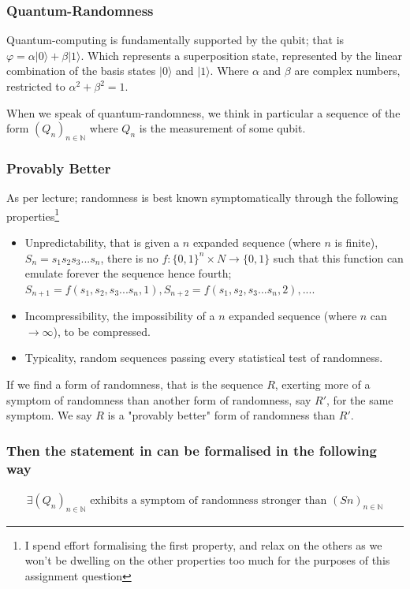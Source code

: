 \documentclass{article}
\begin{document}
\subsubsection*{Quantum-Randomness}
Quantum-computing is fundamentally supported by the qubit; that is $\varphi = \alpha | 0\rangle + \beta | 1\rangle$. Which represents a superposition state, represented by the linear combination of the basis states $| 0\rangle$ and $| 1\rangle$. Where $\alpha$ and $\beta$ are complex numbers, restricted to $\alpha^2 + \beta^2 = 1$. 

When we speak of quantum-randomness, we think in particular a sequence of the form $(Q_n)_{n \in \mathbb{N}}$ where $Q_n$ is the measurement of some qubit.

\pagebreak
\subsubsection*{Provably Better}
As per lecture; randomness is best known symptomatically through the following properties\footnote{I spend effort formalising the first property, and relax on the others as we won't be dwelling on the other properties too much for the purposes of this assignment question}

\begin{itemize}
	\item Unpredictability, that is given a $n$ expanded sequence (where $n$ is finite), $S_n=s_1s_2s_3...s_n$, there is no $f: \{0,1\}^n \times N \rightarrow \{0,1\}$ such that this function can emulate forever the sequence hence fourth; $S_{n+1} = f(s_1,s_2,s_3...s_n, 1), S_{n+2} = f(s_1,s_2,s_3...s_n, 2), ...$.
	\item Incompressibility, the impossibility of a $n$ expanded sequence (where $n$ can $\rightarrow \infty$), to be compressed.
	\item Typicality, random sequences passing every statistical test of randomness.
\end{itemize}

If we find a form of randomness, that is the sequence $R$, exerting more of a symptom of randomness than another form of randomness, say $R'$, for the same symptom. We say $R$ is a "provably better" form of randomness than $R'$.

\subsubsection*{Then the statement in can be formalised in the following way}
\begin{align*}
	\exists (Q_n)_{n \in \mathbb{N}} \text{ exhibits a symptom of randomness stronger than } (Sn)_{n\in\mathbb{N}}
\end{align*}
\end{document}
